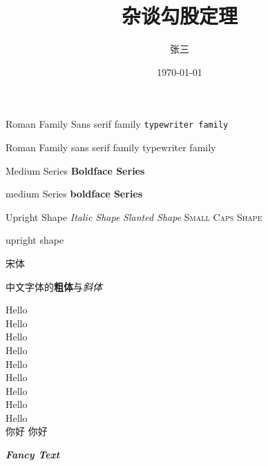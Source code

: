 \documentclass[10pt]{book}%
\title{杂谈勾股定理}
\author{张三}
\date{\today}
\newcommand{\myfont}{\textit{\textbf{\textsf{Fancy Text}}}}
\begin{document}
    \maketitle %

    \textrm{Roman Family} %
    \textsf{Sans serif family} %
    \texttt{typewriter family} %

    \rmfamily Roman Family %
    \sffamily sans serif family
    \ttfamily typewriter family

    \textmd{Medium Series}
    \textbf{Boldface Series}

    \mdseries medium Series
    \bfseries boldface Series


    \textup{Upright Shape}
    \textit{Italic Shape}
    \textsl{Slanted Shape}
    \textsc{Small Caps Shape}

    \upshape upright shape

    {\songti 宋体}    \quad  

    中文字体的\textbf{粗体}与\textit{斜体}

    {\tiny Hello}\\
    {\scriptsize Hello}\\
    {\footnotesize Hello}\\
    {\small Hello}\\
    {\normalsize Hello}\\
    {\Large Hello}\\
    {\LARGE Hello}\\
    {\huge Hello}\\
    {\Huge Hello}\\

     你好
     你好

    \myfont
\end{document}

